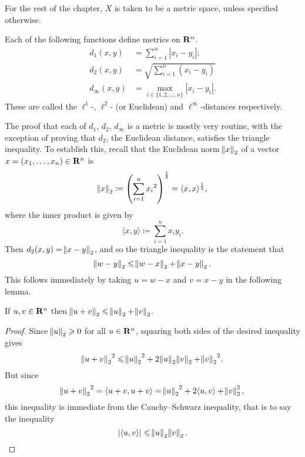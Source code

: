 For the rest of the chapter, $X$ is taken to be a metric space, unless specified otherwise.

\begin{example}[Metrics on $\RR^n$]
Each of the following functions define metrics on $\RR^n$.
\begin{align*}
d_1(x,y)&=\sum_{i=1}^{n}|x_i-y_i|;\\
d_2(x,y)&=\sqrt{\sum_{i=1}^{n}(x_i-y_i)}\\
d_\infty(x,y)&=\max_{i\in\{1,2,\dots,n\}}|x_i-y_i|.
\end{align*}
These are called the $\ell^1$-, $\ell^2$- (or Euclidean) and $\ell^\infty$-distances respectively.

The proof that each of $d_1$, $d_2$, $d_\infty$ is a metric is mostly very routine, with the exception of proving that $d_2$, the Euclidean distance, satisfies the triangle inequality. To establish this, recall that the Euclidean norm $\norm{x}_2$ of a vector $x=(x_1,\dots,x_n)\in\mathbf R^n$ is
\[\norm{x}_2\coloneqq\left(\sum_{i=1}^n{x_i}^2\right)^\frac{1}{2}=\langle x,x\rangle^\frac{1}{2},\]
where the inner product is given by
\[\langle x,y\rangle\coloneqq\sum_{i=1}^{n}x_i y_i.\]
Then $d_2(x,y)=\norm{x-y}_2$, and so the triangle inequality is the statement that
\[\norm{w-y}_2\leqslant\norm{w-x}_2+\norm{x-y}_2.\]
This follows immediately by taking $u=w-x$ and $v=x-y$ in the following lemma.

\begin{lemma*}
If $u,v\in\mathbf R^n$ then $\norm{u+v}_2\leqslant\norm{u}_2+\norm{v}_2$.
\end{lemma*}

\begin{proof}
Since $\norm{u}_2\geqslant0$ for all $u\in\mathbf R^n$, squaring both sides of the desired inequality gives
\[{\norm{u+v}_2}^2\leqslant{\norm{u}_2}^2+2\norm{u}_2\norm{v}_2+{\norm{v}_2}^2.\]
But since
\[{\norm{u+v}_2}^2=\langle u+v,u+v\rangle={\norm{u}_2}^2+2\langle u,v\rangle+\norm{v}_2^2,\]
this inequality is immediate from the Cauchy--Schwarz inequality, that is to say the inequality
\[|\langle u,v\rangle|\leqslant\norm{u}_2\norm{v}_2.\]
\end{proof}
\end{example}

